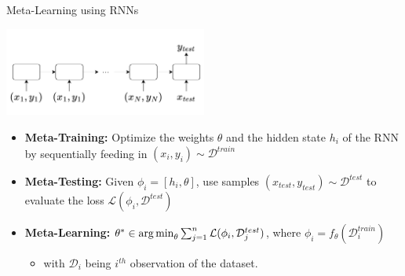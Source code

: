 \documentclass[aspectratio=169]{../latex_main/tntbeamer}  %
\begin{document}
\begin{frame}{Meta-Learning using RNNs~}
    \begin{center}
        \vspace{-1em}
       \includegraphics[width=0.5\textwidth]{images/t02/RNN.png} 
    \end{center}
    
    \pause
    \begin{itemize}
        \item \textbf{Meta-Training:} Optimize the weights $\theta$ and the hidden state $h_i$ of the RNN by sequentially feeding in $(x_i, y_i) \sim \mathcal{D}^{train}$
        \pause
        \item \textbf{Meta-Testing: } Given $\phi_i = [h_i, \theta]$, use samples $(x_{test}, y_{test}) \sim \mathcal{D}^{test}$ to evaluate the loss $\mathcal{L}(\phi_i, \mathcal{D}^{test})$
        \pause
        \item \textbf{Meta-Learning:} $ \theta^* \in \operatorname*{arg\,min}_\theta \sum_{j=1}^n \mathcal{L} ( \phi_i, \mathcal{D}^{test}_j)$, where $\phi_i = f_\theta(\mathcal{D}_i^{train})$
        \begin{itemize}
            \item with $\mathcal{D}_i$ being $i^{th}$ observation of the dataset.
        \end{itemize}
    \end{itemize}

\end{frame}
\end{document}

